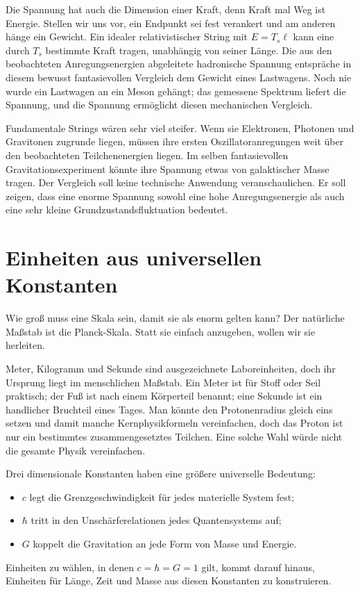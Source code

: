 Die Spannung hat auch die Dimension einer Kraft, denn Kraft mal Weg ist Energie. Stellen wir uns vor, ein Endpunkt sei fest verankert und am anderen hänge ein Gewicht. Ein idealer relativistischer String mit \(E=T_s\ell\) kann eine durch \(T_s\) bestimmte Kraft tragen, unabhängig von seiner Länge. Die aus den beobachteten Anregungsenergien abgeleitete hadronische Spannung entspräche in diesem bewusst fantasievollen Vergleich dem Gewicht eines Lastwagens. Noch nie wurde ein Lastwagen an ein Meson gehängt; das gemessene Spektrum liefert die Spannung, und die Spannung ermöglicht diesen mechanischen Vergleich.

Fundamentale Strings wären sehr viel steifer. Wenn sie Elektronen, Photonen und Gravitonen zugrunde liegen, müssen ihre ersten Oszillatoranregungen weit über den beobachteten Teilchenenergien liegen. Im selben fantasievollen Gravitationsexperiment könnte ihre Spannung etwas von galaktischer Masse tragen. Der Vergleich soll keine technische Anwendung veranschaulichen. Er soll zeigen, dass eine enorme Spannung sowohl eine hohe Anregungsenergie als auch eine sehr kleine Grundzustandsfluktuation bedeutet.

\section{Einheiten aus universellen Konstanten}

Wie groß muss eine Skala sein, damit sie als enorm gelten kann? Der natürliche Maßstab ist die Planck-Skala. Statt sie einfach anzugeben, wollen wir sie herleiten.

Meter, Kilogramm und Sekunde sind ausgezeichnete Laboreinheiten, doch ihr Ursprung liegt im menschlichen Maßstab. Ein Meter ist für Stoff oder Seil praktisch; der Fuß ist nach einem Körperteil benannt; eine Sekunde ist ein handlicher Bruchteil eines Tages. Man könnte den Protonenradius gleich eins setzen und damit manche Kernphysikformeln vereinfachen, doch das Proton ist nur ein bestimmtes zusammengesetztes Teilchen. Eine solche Wahl würde nicht die gesamte Physik vereinfachen.

Drei dimensionale Konstanten haben eine größere universelle Bedeutung:
\begin{itemize}
  \item \(c\) legt die Grenzgeschwindigkeit für jedes materielle System fest;
  \item \(\hbar\) tritt in den Unschärferelationen jedes Quantensystems auf;
  \item \(G\) koppelt die Gravitation an jede Form von Masse und Energie.
\end{itemize}
Einheiten zu wählen, in denen \(c=\hbar=G=1\) gilt, kommt darauf hinaus, Einheiten für Länge, Zeit und Masse aus diesen Konstanten zu konstruieren.

